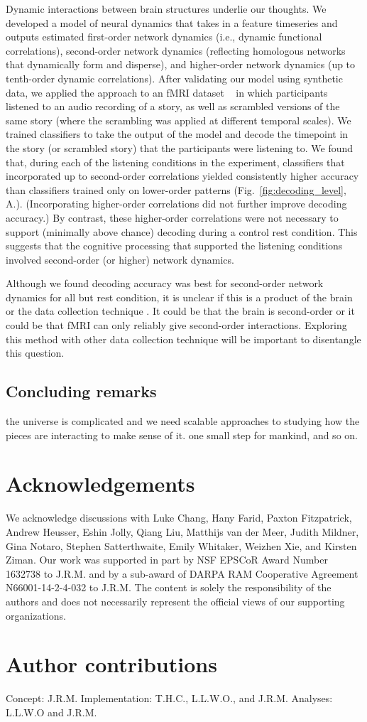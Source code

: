 \documentclass[english]{article}
\begin{document}
Dynamic interactions between brain structures underlie our thoughts.
We developed a model of neural dynamics that takes in a feature
timeseries and outputs estimated first-order network dynamics (i.e.,
dynamic functional correlations), second-order network dynamics
(reflecting homologous networks that dynamically form and disperse),
and higher-order network dynamics (up to tenth-order dynamic
correlations).  After validating our model using synthetic data, we
applied the approach to an fMRI dataset
~\citep{SimoEtal16} in which participants listened to an audio recording of a story, as well as scrambled versions of the same story (where the scrambling was applied at different temporal scales).  We trained classifiers to take the output of the model and decode the timepoint in the story (or scrambled story) that the participants were listening to. We found that, during each of the listening conditions in the
experiment, classifiers that incorporated up to second-order correlations
yielded consistently higher accuracy than classifiers trained only on
lower-order patterns (Fig.~\ref{fig:decoding_level},  A.).  (Incorporating higher-order correlations did
not further improve decoding accuracy.)  By contrast, these
higher-order correlations were not necessary to support (minimally
above chance) decoding during a control rest condition.  This suggests
that the cognitive processing that supported the listening conditions
involved second-order (or higher) network dynamics.

Although we found decoding accuracy was best for second-order network dynamics for all but rest
  condition, it is unclear if this is a product of the brain or the
  data collection technique .  It could be that the brain is
  second-order or it could be that fMRI can
  only reliably give second-order interactions.  Exploring this method
  with other data collection technique will be important to
  disentangle this question.
  



\subsection*{Concluding remarks}
the universe is complicated and we need scalable approaches to
studying how the pieces are interacting to make sense of it.  one
small step for mankind, and so on.

\section*{Acknowledgements}
We acknowledge discussions with Luke Chang, Hany Farid, Paxton
Fitzpatrick, Andrew Heusser, Eshin Jolly, Qiang Liu, Matthijs van der
Meer, Judith Mildner, Gina Notaro, Stephen Satterthwaite, Emily
Whitaker, Weizhen Xie, and Kirsten Ziman. Our work was supported in
part by NSF EPSCoR Award Number 1632738 to J.R.M. and by a sub-award
of DARPA RAM Cooperative Agreement N66001-14-2-4-032 to J.R.M.  The
content is solely the responsibility of the authors and does not
necessarily represent the official views of our supporting
organizations.

\section*{Author contributions}
Concept: J.R.M.  Implementation: T.H.C., L.L.W.O., and
J.R.M.  Analyses: L.L.W.O and J.R.M.



\end{document}
